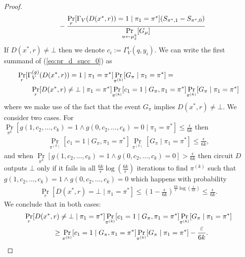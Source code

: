 \begin{proof}
\begin{align}
  & \mbox\qquad - \frac{\underset{r}{\Pr}[\Gamma_V(D(x^*, r)) = 1 \mid \pi_1 = \pi^*](S_{\pi^*,1} - S_{\pi^*,0})}{\underset{u \leftarrow \mu_{\delta}^{k}}{\Pr}[G_{\mu}]}
\end{align}
%
If $D(x^*,r) \neq \bot$ then we denote $c_i := \Gamma_V^{i}(q, y_i)$.
We can write the first summand of (\ref{eq:pr_d_succ_0}) as
\begin{align}
  &\underset{r}{\Pr}[\Gamma_V^{(g)}(D(x^*,r)) = 1 \mid \pi_1 = \pi^*] \underset{\pi^{(k)}}{\Pr}[G_{\pi} \mid \pi_1 = \pi^*] = \notag\\
  &\mbox\qquad \underset{r}{\Pr}[D(x^*,r) \neq \bot \mid \pi_1 = \pi^*]
  \underset{\pi^{(k)}}{\Pr}[c_1 = 1 \mid G_{\pi}, \pi_1 = \pi^*]
  \underset{\pi^{(k)}}{\Pr}[G_{\pi} \mid \pi_1 = \pi^*]
\end{align}
where we make use of the fact that the event $G_{\pi}$ implies $D(x^*, r) \neq \bot$.
We consider two cases.
For $\underset{\pi^{k}}{\Pr}[g(1, c_2, \dots, c_k) = 1 \land g(0, c_2, \dots,c_k ) = 0 \mid \pi_1 = \pi^*] \leq \frac{\epsilon}{6k}$ then
\begin{align}
  \underset{\pi^{(k)}}{\Pr}[c_1 = 1 \mid G_{\pi}, \pi_1 = \pi^*] \underset{\pi^{(k)}}{\Pr}[G_{\pi} \mid \pi_1 = \pi^*] \leq \frac{\epsilon}{6k},
\end{align}
and when $\underset{\pi^{k}}{\Pr}[g(1, c_2, \dots, c_k) = 1 \land g(0, c_2, \dots,c_k ) = 0] > \frac{\epsilon}{6k}$ then circuit $D$ outputs $\bot$
only if it fails in all $\frac{6k}{\epsilon} \log(\frac{6k}{\epsilon})$ iterations to find $\pi^{(k)}$ such that $g(1, c_2, \dots, c_k) = 1 \land g(0, c_2, \dots, c_k) = 0$
which happens with probability
\begin{align}
\underset{r}{\Pr}[D(x^*,r) = \bot \mid \pi_1 = \pi^*] \leq (1 - \frac{\epsilon}{6k})^{\frac{6k}{\epsilon}\log(\frac{\epsilon}{6k})} \leq \frac{\epsilon}{6k}.
\end{align}
We conclude that in both cases:
\begin{align}
  &\underset{r}{\Pr}[D(x^*,r) \neq \bot \mid \pi_1 = \pi^*]
  \underset{\pi^{(k)}}{\Pr}[c_1 = 1 \mid G_{\pi}, \pi_1 = \pi^*]
  \underset{\pi^{(k)}}{\Pr}[G_{\pi} \mid \pi_1 = \pi^*] \notag\\
  &\IndII \geq \underset{\pi^{(k)}}{\Pr}[c_1 = 1 \mid G_{\pi}, \pi_1 = \pi^*]\underset{\pi^{(k)}}{\Pr}[G_{\pi} \mid \pi_1 = \pi^*] - \frac{\epsilon}{6k}.

\end{align}
\end{proof}
